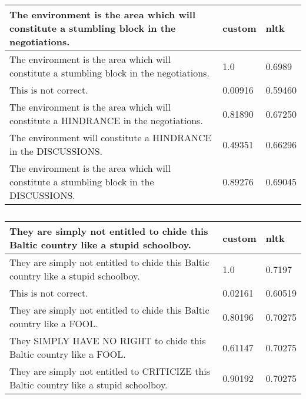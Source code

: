 \documentclass[a4paper,landscape]{article}
\begin{document}
\begin{table}
    \begin{tabular}{l l l}
      \toprule
      The environment is the area which will constitute a stumbling block in the negotiations. & custom & nltk \\
      \midrule
      The environment is the area which will constitute a stumbling block in the negotiations. & 1.0 & 0.6989 \\
      This is not correct. & 0.00916 & 0.59460 \\
      The environment is the area which will constitute a HINDRANCE in the negotiations. & 0.81890 & 0.67250 \\
      The environment will constitute a HINDRANCE in the DISCUSSIONS. & 0.49351 & 0.66296 \\
      The environment is the area which will constitute a stumbling block in the DISCUSSIONS. & 0.89276 & 0.69045 \\
      \bottomrule
    \end{tabular}
  \caption{}
\end{table}

\begin{table}
    \begin{tabular}{l l l}
      \toprule
      They are simply not entitled to chide this Baltic country like a stupid schoolboy. & custom & nltk \\
      \midrule
      They are simply not entitled to chide this Baltic country like a stupid schoolboy. & 1.0 & 0.7197 \\
      This is not correct. & 0.02161 & 0.60519 \\
      They are simply not entitled to chide this Baltic country like a FOOL. & 0.80196 & 0.70275 \\
      They SIMPLY HAVE NO RIGHT to chide this Baltic country like a FOOL. & 0.61147 & 0.70275 \\
      They are simply not entitled to CRITICIZE this Baltic country like a stupid schoolboy. & 0.90192 & 0.70275 \\
      \bottomrule
    \end{tabular}
  \caption{}
\end{table}
\end{document}
